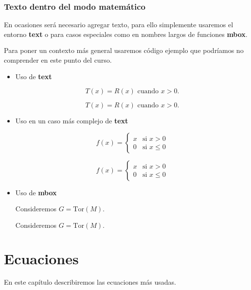 \documentclass[graybox,envcountchap,sectrefs]{svmono}
\begin{document}
    \subsection{Texto dentro del modo matemático}
        En ocasiones será necesario agregar texto, para ello simplemente usaremos el entorno \textbf{text}
        o para casos especiales como en nombres largos de funciones \textbf{mbox}.

        Para poner un contexto más general usaremos código ejemplo que podríamos no comprender en este punto del curso.
        \begin{itemize}
            \item Uso de \textbf{text}
                \begin{code}
                    \[T(x) = R(x) \text{ cuando } x>0.\]
                \end{code}
                \begin{compiled}
                    \[T(x) = R(x) \text{ cuando } x>0.\]
                \end{compiled}
            \item Uso en un caso más complejo de \textbf{text}
    \begin{code}
        \[ f(x) = \begin {cases}
                    x & \text{si } x>0 \\
                0 & \text{si } x\leq 0 \end{cases}\]

    \end{code}
    \begin{compiled}
        \[ f(x) = \begin {cases}
                    x & \text{si } x>0 \\
                0 & \text{si } x\leq 0 \end{cases}\]
    \end{compiled}
            \item Uso de \textbf{mbox}
                \begin{code}
                    Consideremos \(G=\mbox{Tor}(M)\).
                \end{code}
                \begin{compiled}
                    Consideremos \(G=\mbox{Tor}(M)\).
                \end{compiled}
        \end{itemize}
 
\chapter{Ecuaciones}
    En este capítulo describiremos las ecuaciones más usadas.
\end{document}
